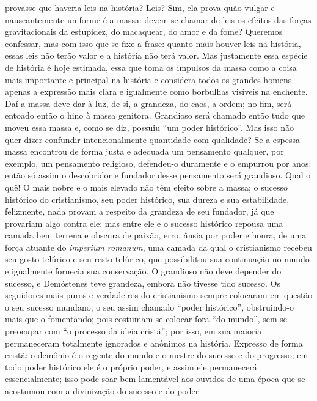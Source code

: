 \begin{enumerate}
\begin{enumerate}
    provasse que haveria leis na história? Leis? Sim, ela prova quão
    vulgar e nauseantemente uniforme é a massa: devem-se chamar de leis
    os efeitos das forças gravitacionais da estupidez, do macaquear, do
    amor e da fome? Queremos confessar, mas com isso que se fixe a
    frase: quanto mais houver leis na história, essas leis não terão
    valor e a história não terá valor. Mas justamente essa espécie de
    história é hoje estimada, essa que toma os impulsos da massa como a
    coisa mais importante e principal na história e considera todos os
    grandes homens apenas a expressão mais clara e igualmente como
    borbulhas visíveis na enchente. Daí a massa deve dar à luz, de si, a
    grandeza, do caos, a ordem; no fim, será entoado então o hino à
    massa genitora. Grandioso será chamado então tudo que moveu essa
    massa e, como se diz, possuiu ``um poder histórico''. Mas isso não
    quer dizer confundir intencionalmente quantidade com qualidade? Se a
    espessa massa encontrou de forma justa e adequada um pensamento
    qualquer, por exemplo, um pensamento religioso, defendeu-o duramente
    e o empurrou por anos: então só assim o descobridor e fundador desse
    pensamento será grandioso. Qual o quê! O mais nobre e o mais elevado
    não têm efeito sobre a massa; o sucesso histórico do cristianismo,
    seu poder histórico, sua dureza e sua estabilidade, felizmente, nada
    provam a respeito da grandeza de seu fundador, já que provariam algo
    contra ele: mas entre ele e o sucesso histórico repousa uma camada
    bem terrena e obscura de paixão, erro, ânsia por poder e honra, de
    uma força atuante do \emph{imperium romanum}, uma camada da qual o
    cristianismo recebeu seu gosto telúrico e seu resto telúrico, que
    possibilitou sua continuação no mundo e igualmente fornecia sua
    conservação. O grandioso não deve depender do sucesso, e Demóstenes
    teve grandeza, embora não tivesse tido sucesso. Os seguidores mais
    puros e verdadeiros do cristianismo sempre colocaram em questão o
    seu sucesso mundano, o seu assim chamado ``poder histórico'',
    obstruindo-o mais que o fomentando; pois costumam se colocar fora
    ``do mundo'', sem se preocupar com ``o processo da ideia cristã'';
    por isso, em sua maioria permaneceram totalmente ignorados e
    anônimos na história. Expresso de forma cristã: o demônio é o
    regente do mundo e o mestre do sucesso e do progresso; em todo poder
    histórico ele é o próprio poder, e assim ele permanecerá
    essencialmente; isso pode soar bem lamentável aos ouvidos de uma
    época que se acostumou com a divinização do sucesso e do poder

\end{enumerate}
\end{enumerate}
